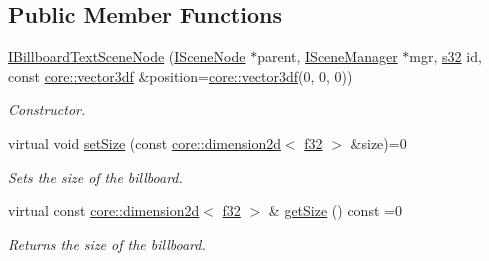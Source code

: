 \subsection*{Public Member Functions}
\begin{DoxyCompactItemize}
\item 
\mbox{\label{classirr_1_1scene_1_1IBillboardTextSceneNode_a758a6a0ec2f76ee7623f19a55f1e7c4b}} 
\hyperlink{classirr_1_1scene_1_1IBillboardTextSceneNode_a758a6a0ec2f76ee7623f19a55f1e7c4b}{I\+Billboard\+Text\+Scene\+Node} (\hyperlink{classirr_1_1scene_1_1ISceneNode}{I\+Scene\+Node} $\ast$parent, \hyperlink{classirr_1_1scene_1_1ISceneManager}{I\+Scene\+Manager} $\ast$mgr, \hyperlink{namespaceirr_ac66849b7a6ed16e30ebede579f9b47c6}{s32} id, const \hyperlink{namespaceirr_1_1core_ae6e2b2a6c552833ebbd5b7463d03586b}{core\+::vector3df} \&position=\hyperlink{namespaceirr_1_1core_ae6e2b2a6c552833ebbd5b7463d03586b}{core\+::vector3df}(0, 0, 0))
\begin{DoxyCompactList}\small\item\em Constructor. \end{DoxyCompactList}\item 
\mbox{\label{classirr_1_1scene_1_1IBillboardTextSceneNode_a506ca9b0ef160993fc44f4e0b5b97b63}} 
virtual void \hyperlink{classirr_1_1scene_1_1IBillboardTextSceneNode_a506ca9b0ef160993fc44f4e0b5b97b63}{set\+Size} (const \hyperlink{classirr_1_1core_1_1dimension2d}{core\+::dimension2d}$<$ \hyperlink{namespaceirr_a0277be98d67dc26ff93b1a6a1d086b07}{f32} $>$ \&size)=0
\begin{DoxyCompactList}\small\item\em Sets the size of the billboard. \end{DoxyCompactList}\item 
\mbox{\label{classirr_1_1scene_1_1IBillboardTextSceneNode_aead5178207d887357fb7f3fbddcc51d6}} 
virtual const \hyperlink{classirr_1_1core_1_1dimension2d}{core\+::dimension2d}$<$ \hyperlink{namespaceirr_a0277be98d67dc26ff93b1a6a1d086b07}{f32} $>$ \& \hyperlink{classirr_1_1scene_1_1IBillboardTextSceneNode_aead5178207d887357fb7f3fbddcc51d6}{get\+Size} () const =0
\begin{DoxyCompactList}\small\item\em Returns the size of the billboard. \end{DoxyCompactList}\item 

\end{DoxyCompactItemize}
